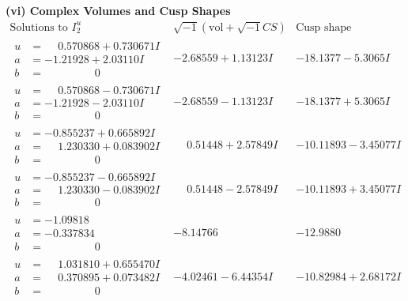 \documentclass[1p]{elsarticle_modified}
\theoremstyle{definition}
\newcommand{\I}{\sqrt{-1}}
\begin{document}
\newpage\flushleft \textbf{(vi) Complex Volumes and Cusp Shapes}
$$\begin{array}{c|c|c}  
\text{Solutions to }I^u_{2}& \I (\text{vol} + \sqrt{-1}CS) & \text{Cusp shape}\\
 \hline 
\begin{aligned}
u &= \phantom{-}0.570868 + 0.730671 I \\
a &= -1.21928 + 2.03110 I \\
b &= \phantom{-0.000000 } 0\end{aligned}
 & -2.68559 + 1.13123 I & -18.1377 - 5.3065 I \\ \hline\begin{aligned}
u &= \phantom{-}0.570868 - 0.730671 I \\
a &= -1.21928 - 2.03110 I \\
b &= \phantom{-0.000000 } 0\end{aligned}
 & -2.68559 - 1.13123 I & -18.1377 + 5.3065 I \\ \hline\begin{aligned}
u &= -0.855237 + 0.665892 I \\
a &= \phantom{-}1.230330 + 0.083902 I \\
b &= \phantom{-0.000000 } 0\end{aligned}
 & \phantom{-}0.51448 + 2.57849 I & -10.11893 - 3.45077 I \\ \hline\begin{aligned}
u &= -0.855237 - 0.665892 I \\
a &= \phantom{-}1.230330 - 0.083902 I \\
b &= \phantom{-0.000000 } 0\end{aligned}
 & \phantom{-}0.51448 - 2.57849 I & -10.11893 + 3.45077 I \\ \hline\begin{aligned}
u &= -1.09818\phantom{ +0.000000I} \\
a &= -0.337834\phantom{ +0.000000I} \\
b &= \phantom{-0.000000 } 0\end{aligned}
 & -8.14766\phantom{ +0.000000I} & -12.9880\phantom{ +0.000000I} \\ \hline\begin{aligned}
u &= \phantom{-}1.031810 + 0.655470 I \\
a &= \phantom{-}0.370895 + 0.073482 I \\
b &= \phantom{-0.000000 } 0\end{aligned}
 & -4.02461 - 6.44354 I & -10.82984 + 2.68172 I \\ \hline\begin{aligned}

\end{aligned}
\end{array}$$
\end{document}
